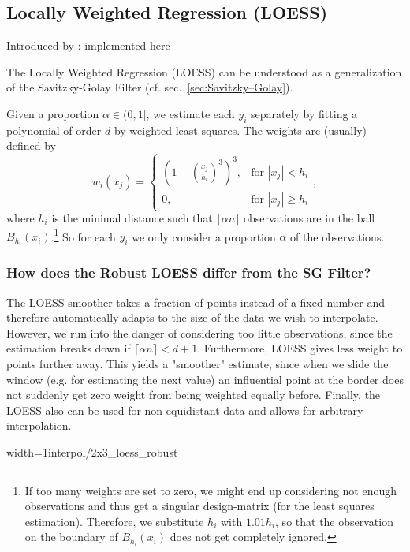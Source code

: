\subsection{Locally Weighted Regression (LOESS)}
\label{sec:loess}
Introduced by : \cite{clevelandRobustLocallyWeighted1979}
implemented here \cite{cappellariATLAS3DProjectXX2013}

The Locally Weighted Regression (LOESS) can be understood as a generalization of the Savitzky-Golay Filter (cf. sec.~\ref{sec:Savitzky–Golay}).

Given a proportion $\alpha \in (0,1]$, we estimate each $y_i$ separately by fitting a polynomial of order $d$ by weighted least squares. The weights are (usually) defined by
$$w_i(x_j)=\begin{cases}
		\left(1-\left(\frac{x_j}{h_i}\right)^{3}\right)^{3}, & \text{for } |x_j|<h_i           \\
		0,                                                   & \text{for } |x_j| \geqslant h_i
	\end{cases} ,$$
where $h_i$ is the minimal distance such that $\lceil \alpha n\rceil$ observations are in the ball $B_{h_i}(x_i)$.\footnote{If too many weights are set to zero, we might end up considering not enough observations and thus get a singular design-matrix (for the least squares estimation). Therefore, we substitute $h_i$ with $1.01 h_i$, so that the observation on the boundary of $B_{h_i}(x_i)$ does not get completely ignored.} So for each $y_i$ we only consider a proportion $\alpha$ of the observations.

\subsubsection{How does the Robust LOESS differ from the SG Filter?}
The LOESS smoother takes a fraction of points instead of a fixed number and therefore automatically adapts to the size of the data we wish to interpolate. However, we run into the danger of considering too little observations, since the estimation breaks down if $\lceil \alpha n\rceil < d+1$.
Furthermore, LOESS gives less weight to points further away. This yields a "smoother" estimate, since when we slide the window (e.g. for estimating the next value) an influential point at the border does not suddenly get zero weight from being weighted equally before.
Finally, the LOESS also can be used for non-equidistant data and allows for arbitrary interpolation.

\begin{my_figure}[h]{width=1\textwidth}{interpol/2x3_loess_robust}
	\caption{The LOESS smoother \RobItPlot}
	\label{fig:interpol/2x3_loess_robust}
\end{my_figure}

